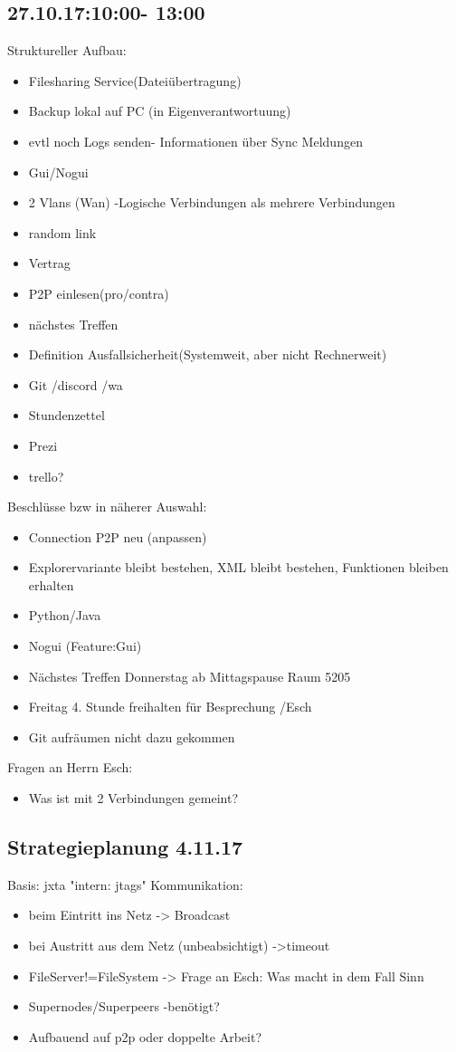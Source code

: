 \documentclass[a4paper,11pt]{article}
\begin{document}
\subsection{27.10.17:10:00- 13:00}
Struktureller Aufbau:
\begin{itemize}
\setlength\itemsep{0.2em}
\item Filesharing Service(Datei\"ubertragung)
\item Backup lokal auf PC (in Eigenverantwortuung)
\item evtl noch Logs senden-  Informationen über Sync Meldungen
\item Gui/Nogui
\item 2 Vlans (Wan) -Logische Verbindungen als mehrere Verbindungen
\item random link
\item Vertrag
\item P2P einlesen(pro/contra)
\item n\"achstes Treffen
\item Definition Ausfallsicherheit(Systemweit, aber nicht Rechnerweit)
\item Git /discord /wa
\item Stundenzettel
\item Prezi
\item trello?
\end{itemize}

Beschl\"usse bzw in n\"aherer Auswahl:
\begin{itemize}
\setlength\itemsep{0.2em}
\item Connection P2P neu (anpassen)
\item Explorervariante bleibt bestehen, XML bleibt bestehen, Funktionen bleiben erhalten
\item Python/Java
\item Nogui (Feature:Gui)
\item Nächstes Treffen Donnerstag ab Mittagspause Raum 5205 
\item Freitag 4. Stunde freihalten f\"ur Besprechung /Esch
\item Git aufr\"aumen nicht dazu gekommen
\end{itemize}
Fragen an Herrn Esch:
\begin{itemize}
\setlength\itemsep{0.2em}
\item Was ist mit 2 Verbindungen gemeint?
\end{itemize}

\subsection{Strategieplanung 4.11.17}
Basis: jxta "intern: jtags"
Kommunikation:
\begin{itemize}
\setlength\itemsep{0.2em}
\item beim Eintritt ins Netz -> Broadcast
\item bei Austritt aus dem Netz (unbeabsichtigt) ->timeout
\item FileServer!=FileSystem -> Frage an Esch: Was macht in dem Fall Sinn
\item Supernodes/Superpeers -benötigt?
\item Aufbauend auf p2p oder doppelte Arbeit?
\end{itemize}
\end{document}
